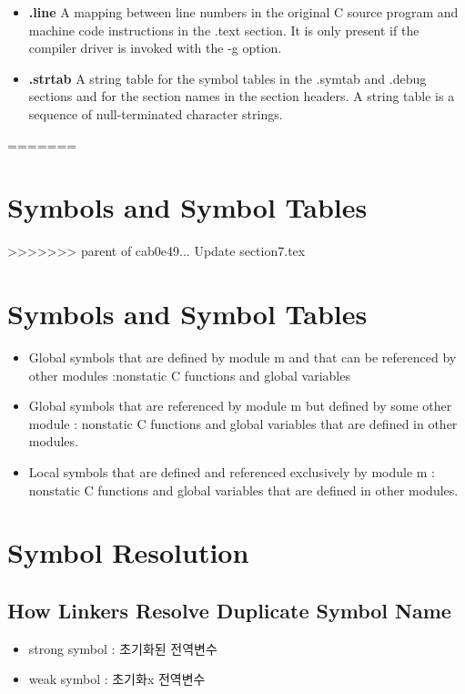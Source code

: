\begin{itemize}
    \item \textbf{.line} A mapping between line numbers in the original C source program and machine code instructions in the .text section. It is only present if the compiler driver is invoked with the -g option.
    \item \textbf{.strtab} A string table for the symbol tables in the .symtab and .debug sections and for the section names in the section headers. A string table is a sequence of null-terminated character strings.
\end{itemize}
=======

\section{Symbols and Symbol Tables}
>>>>>>> parent of cab0e49... Update section7.tex

\section{Symbols and Symbol Tables}

\begin{itemize}
    \item Global symbols that are defined by module m and that can be referenced by other modules :nonstatic C functions and global variables
    \item Global symbols that are referenced by module m but defined by some other module : nonstatic C functions and global variables that are defined in other modules.
    \item Local symbols that are defined and referenced exclusively by module m : nonstatic C functions and global variables that are defined in other modules.
\end{itemize}

\section{Symbol Resolution}

\subsection{How Linkers Resolve Duplicate Symbol Name}

\begin{itemize}
    \item strong symbol : 초기화된 전역변수
    \item weak symbol : 초기화x 전역변수
\end{itemize}

